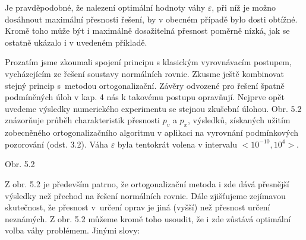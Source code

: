 Je pravděpodobné, že nalezení
optimální hodnoty váhy $\varepsilon$, při níž je možno dosáhnout
maximální přesnosti řešení, by v obecném případě bylo dosti
obtížné. Kromě toho může být i maximálně dosažitelná přesnost poměrně
nízká, jak se ostatně ukázalo i v uvedeném příkladě.

Prozatím jsme zkoumali spojení  principu s klasickým
vyrovnávacím postupem, vycházejícím ze řešení soustavy
normálních rovnic. Zkusme ještě kombinovat stejný princip s~metodou
ortogonalizační. Závěry odvozené pro řešení špatně podmíněných
úloh v kap. 4 nás k takovému postupu opravňují. Nejprve opět
uvedeme výsledky numerického experimentu se stejnou zkušební
úlohou.  Obr. 5.2 znázorňuje průběh charakteristik přesnosti $p_v$ a
$p_x$, výsledků, získaných užitím zobecněného ortogonalizačního
algoritmu v aplikaci na vyrovnání podmínkových pozorování (odst.
3.2). Váha $\varepsilon$ byla tentokrát volena v intervalu
$<\!10^{-10}, 10^4\!>$.


\begin{center}

Obr. 5.2
\end{center}

\noindent
Z obr. 5.2 je především patrno, že ortogonalizační metoda i zde dává
přesnější výsledky než přechod na řešení normálních rovnic. Dále
zjišťujeme zejímavou skutečnost, že přesnost v~určení oprav je jiná
(vyšší) než přesnost určení neznámých.  Z obr. 5.2 můžeme kromě toho
usoudit, že i zde zůstává optimální volba váhy problémem. Jinými
slovy: 



